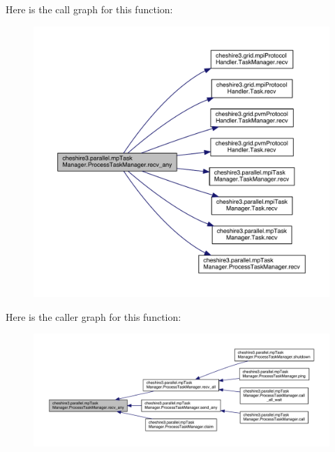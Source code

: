 Here is the call graph for this function\-:
\nopagebreak
\begin{figure}[H]
\begin{center}
\leavevmode
\includegraphics[width=350pt]{classcheshire3_1_1parallel_1_1mp_task_manager_1_1_process_task_manager_aefe73e58ab79274d14fb09f1c410cd16_cgraph}
\end{center}
\end{figure}




Here is the caller graph for this function\-:
\nopagebreak
\begin{figure}[H]
\begin{center}
\leavevmode
\includegraphics[width=350pt]{classcheshire3_1_1parallel_1_1mp_task_manager_1_1_process_task_manager_aefe73e58ab79274d14fb09f1c410cd16_icgraph}
\end{center}
\end{figure}


